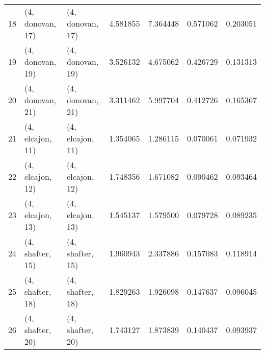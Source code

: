 \begin{tabular}{lllrrrr}
18 &  (4, donovan, 17) &  (4, donovan, 17) &  4.581855 &  7.364448 &   0.571062 &  0.203051 \\
19 &  (4, donovan, 19) &  (4, donovan, 19) &  3.526132 &  4.675062 &   0.426729 &  0.131313 \\
20 &  (4, donovan, 21) &  (4, donovan, 21) &  3.311462 &  5.997704 &   0.412726 &  0.165367 \\
21 &  (4, elcajon, 11) &  (4, elcajon, 11) &  1.354065 &  1.286115 &   0.070061 &  0.071932 \\
22 &  (4, elcajon, 12) &  (4, elcajon, 12) &  1.748356 &  1.671082 &   0.090462 &  0.093464 \\
23 &  (4, elcajon, 13) &  (4, elcajon, 13) &  1.545137 &  1.579500 &   0.079728 &  0.089235 \\
24 &  (4, shafter, 15) &  (4, shafter, 15) &  1.960943 &  2.337886 &   0.157083 &  0.118914 \\
25 &  (4, shafter, 18) &  (4, shafter, 18) &  1.829263 &  1.926098 &   0.147637 &  0.096045 \\
26 &  (4, shafter, 20) &  (4, shafter, 20) &  1.743127 &  1.873839 &   0.140437 &  0.093937 \\
\bottomrule
\end{tabular}
